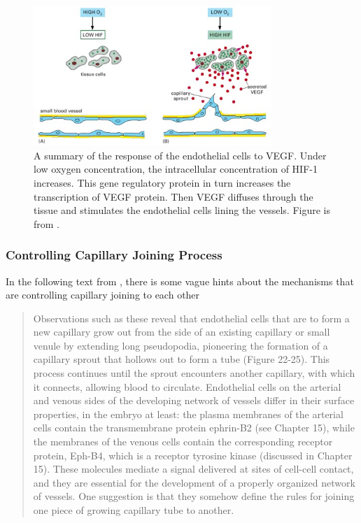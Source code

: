 \begin{figure}[h!]
	\centering
	\includegraphics[width=0.8\textwidth]{images/endothelialResponseToVEGF.jpg}
	\caption{A summary of the response of the endothelial cells to VEGF.  Under low oxygen concentration, the intracellular concentration of HIF-1 increases. This gene regulatory protein in turn increases the transcription of VEGF protein. Then VEGF diffuses through the tissue and stimulates the endothelial cells lining the vessels. Figure is from \cite{Alberts2002}.}
\end{figure}


\subsubsection*{Controlling Capillary Joining Process}
In the following text from \cite{Alberts2002}, there is some vague hints about the mechanisms that are controlling capillary joining to each other


\begin{quote}
	Observations such as these reveal that endothelial cells that are to form a new capillary grow out from the side of an existing capillary or small venule by extending long pseudopodia, pioneering the formation of a capillary sprout that hollows out to form a tube (Figure 22-25). This process continues until the sprout encounters another capillary, with which it connects, allowing blood to circulate. Endothelial cells on the arterial and venous sides of the developing network of vessels differ in their surface properties, in the embryo at least: the plasma membranes of the arterial cells contain the transmembrane protein ephrin-B2 (see Chapter 15), while the membranes of the venous cells contain the corresponding receptor protein, Eph-B4, which is a receptor tyrosine kinase (discussed in Chapter 15). These molecules mediate a signal delivered at sites of cell-cell contact, and they are essential for the development of a properly organized network of vessels. One suggestion is that they somehow define the rules for joining one piece of growing capillary tube to another.

\end{quote}

